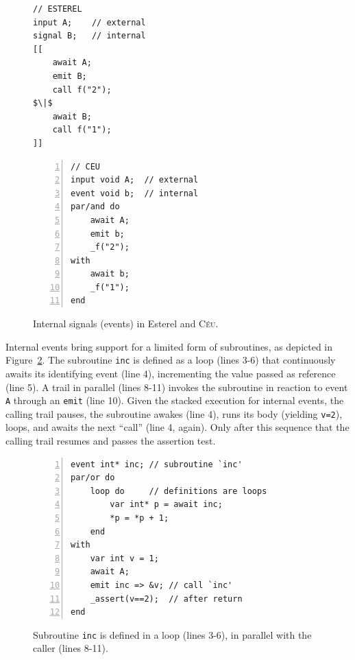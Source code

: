 \documentclass{sigplanconf}
\newcommand{\CEU}{\textsc{C\'{e}u}\xspace}
\newcommand{\code}[1] {{\small{\texttt{#1}}}}
\newcommand{\1}{\;}
\newcommand{\2}{\;\;}
\newcommand{\3}{\;\;\;}
\newcommand{\5}{\;\;\;\;\;}
\begin{document}
\begin{figure}[!t]
\begin{minipage}[t]{0.43\linewidth}
\begin{lstlisting}[mathescape=true]
// ESTEREL
input A;    // external
signal B;   // internal
[[
    await A;
    emit B;
    call f("2");
$\|$
    await B;
    call f("1");
]]
\end{lstlisting}
\end{minipage}
%
\begin{minipage}[t]{0.56\linewidth}
\begin{lstlisting}[numbers=left,xleftmargin=3.1em]
// CEU
input void A;  // external
event void b;  // internal
par/and do
    await A;
    emit b;
    _f("2");
with
    await b;
    _f("1");
end
\end{lstlisting}
\end{minipage}
\caption{ Internal signals (events) in Esterel and \CEU. \newline
\label{lst.prints}
}
\end{figure}

Internal events bring support for a limited form of subroutines, as depicted in 
Figure~\ref{lst.sub}.
The subroutine \code{inc} is defined as a loop (lines 3-6) that continuously 
awaits its identifying event (line 4), incrementing the value passed as 
reference (line 5).
A trail in parallel (lines 8-11) invokes the subroutine in reaction to event 
\code{A} through an \code{emit} (line 10).
Given the stacked execution for internal events, the calling trail pauses, the 
subroutine awakes (line 4), runs its body (yielding \code{v=2}), loops, and 
awaits the next ``call'' (line 4, again).
Only after this sequence that the calling trail resumes and passes the 
assertion test.
 
\begin{figure}
\begin{lstlisting}[numbers=left,xleftmargin=2em]
event int* inc; // subroutine `inc'
par/or do
    loop do     // definitions are loops
        var int* p = await inc;
        *p = *p + 1;
    end
with
    var int v = 1;
    await A;
    emit inc => &v; // call `inc'
    _assert(v==2);  // after return
end
\end{lstlisting}
\caption{ Subroutine \code{inc} is defined in a loop (lines 3-6), in parallel 
with the caller (lines 8-11).
\label{lst.sub}
}
\end{figure}
\end{document}

